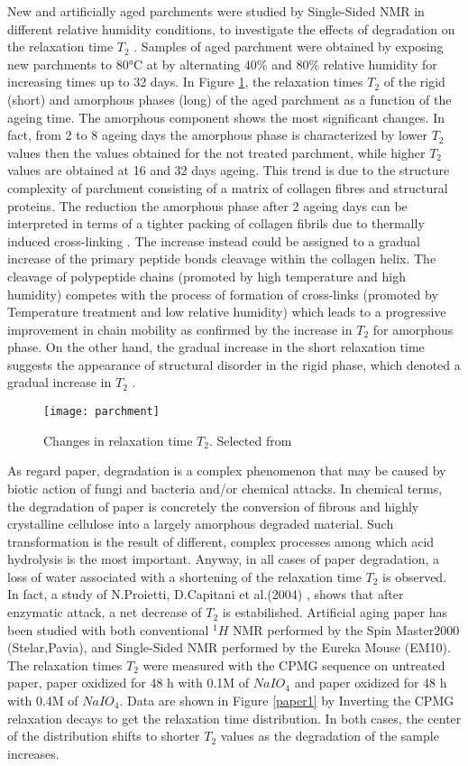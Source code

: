 \documentclass[a4paper,11pt]{report}
\begin{document}
New and artificially aged parchments were studied by Single-Sided NMR in different relative humidity conditions, to investigate the effects of degradation on the relaxation time $T_2$ \cite{ottopaper}. Samples of aged parchment were obtained by exposing new parchments to \ang{80}C at by alternating $40\%$ and $80\%$ relative humidity for increasing times up to 32 days. In Figure \ref{parchment}, the relaxation times $T_2$ of the rigid (short) and amorphous phases (long) of the aged parchment as a function of the ageing time.  The amorphous component shows the most significant changes. In fact, from 2 to 8 ageing days the amorphous phase is characterized by lower $T_2$ values then the values obtained for the not treated parchment, while higher $T_2$ values are obtained at 16 and 32 days ageing. This trend is due to the structure complexity of parchment consisting of a matrix of collagen fibres and structural proteins. The reduction the amorphous phase after 2 ageing days can be interpreted in terms of a tighter packing of collagen fibrils due to thermally induced cross-linking \cite{ottopaper}. The increase instead could be assigned to a gradual increase of the primary peptide bonds cleavage within the collagen helix. The cleavage of polypeptide chains (promoted by high temperature and high humidity) competes with the process of formation of cross-links (promoted by Temperature treatment and low relative humidity) which leads to a progressive improvement in chain mobility as confirmed by the increase in $T_2$ for amorphous phase. On the other hand, the gradual increase in the short relaxation time suggests the appearance of structural disorder in the rigid phase, which denoted a gradual increase in $T_2$ \cite{ottopaper}.
\begin{figure}[h]
	\centering
	\texttt{[image: parchment]}
	\caption{Changes in relaxation time $T_2$. Selected from \cite{ottopaper} }\label{parchment}
\end{figure}
As regard paper, degradation is a complex phenomenon that may be caused by biotic action of fungi and bacteria and/or chemical attacks. In chemical terms, the degradation of paper is concretely the conversion of fibrous and highly crystalline cellulose into a largely amorphous degraded material. Such transformation is the result of different, complex processes among which acid hydrolysis is the most important. Anyway, in all cases of paper degradation, a loss of water associated with a shortening of the  relaxation time $T_2$ is observed. In fact, a study of N.Proietti, D.Capitani et al.(2004) \cite{settepaper}, shows that after enzymatic attack, a net decrease of $T_2$ is estabilished. Artificial aging paper has been studied with both conventional $^1H$ NMR performed by the Spin Master2000 (Stelar,Pavia), and Single-Sided NMR performed by the Eureka Mouse (EM10). The relaxation times $T_2$ were measured with the CPMG sequence on untreated paper, paper oxidized for 48 h with 0.1M of $NaIO_4$ and  paper oxidized for 48 h with 0.4M of $NaIO_4$. Data are shown in Figure \ref{paper1} by Inverting the CPMG relaxation decays to get the relaxation time distribution. In both cases, the center of the distribution shifts to shorter $T_2$ values as the degradation of the sample increases.
\end{document}
